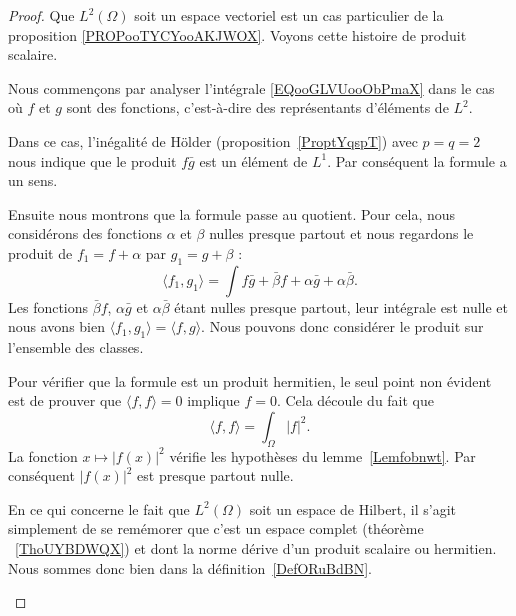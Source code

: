 \begin{proof}
	Que \( L^2(\Omega)\) soit un espace vectoriel est un cas particulier de la proposition \ref{PROPooTYCYooAKJWOX}. Voyons cette histoire de produit scalaire.

	\begin{subproof}
		Nous commençons par analyser l'intégrale \eqref{EQooGLVUooObPmaX} dans le cas où \( f\) et \( g\) sont des fonctions, c'est-à-dire des représentants d'éléments de \( L^2\).

		Dans ce cas, l'inégalité de Hölder (proposition~\ref{ProptYqspT}) avec \( p=q=2\) nous indique que le produit \( f\bar g\) est un élément de \( L^1\). Par conséquent la formule a un sens.


		Ensuite nous montrons que la formule passe au quotient. Pour cela, nous considérons des fonctions \( \alpha\) et \( \beta\) nulles presque partout et nous regardons le produit de \( f_1=f+\alpha\) par \( g_1=g+\beta\) :
		\begin{equation}
			\langle f_1, g_1\rangle =\int f\bar g+\bar\beta f+\alpha \bar g+ \alpha\bar\beta.
		\end{equation}
		Les fonctions \( \bar\beta f\), \( \alpha \bar g\) et \( \alpha\bar\beta\) étant nulles presque partout, leur intégrale est nulle et nous avons bien \( \langle f_1, g_1\rangle =\langle f,g \rangle \). Nous pouvons donc considérer le produit sur l'ensemble des classes.

		Pour vérifier que la formule est un produit hermitien, le seul point non évident est de prouver que \( \langle f, f\rangle =0\) implique \( f=0\). Cela découle du fait que
		\begin{equation}
			\langle f, f\rangle =\int_{\Omega}| f |^2.
		\end{equation}
		La fonction \( x\mapsto | f(x) |^2\) vérifie les hypothèses du lemme~\ref{Lemfobnwt}. Par conséquent \( | f(x) |^2\) est presque partout nulle.

		En ce qui concerne le fait que \( L^2(\Omega)\) soit un espace de Hilbert, il s'agit simplement de se remémorer que c'est un espace complet (théorème ~\ref{ThoUYBDWQX}) et dont la norme dérive d'un produit scalaire ou hermitien. Nous sommes donc bien dans la définition~\ref{DefORuBdBN}.
	\end{subproof}
\end{proof}

